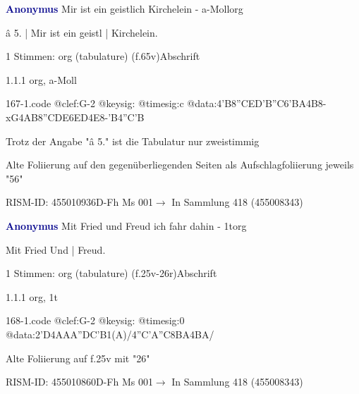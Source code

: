 \documentclass[twocolumn, 12pt]{book}
\begin{document}
\par \vspace{16pt} \textcolor{darkblue}{\textbf{Anonymus  }}\hfillplus{\textbf{[167]}}\newline Mir ist ein geistlich Kirchelein - a-Moll\newline org
\par \begin{itshape}[f.65v, at left:] â 5. | Mir ist ein geistl | Kirchelein.\end{itshape} 
\par \textcolor{darkblue}{}  1 Stimmen: org (tabulature)  (f.65v)\newline Abschrift
\par 1.1.1  org, a-Moll  
\begin{filecontents*}{167-1.code}
@clef:G-2
@keysig:
@timesig:c
@data:4'B{8''CE}{D'B''C6'BA}4B8-xG4AB{8''CDE6ED}4E8-'B4''C'B
\end{filecontents*}
\newline %
\par Trotz der Angabe "â 5." ist die Tabulatur nur zweistimmig
\par Alte Foliierung auf den gegenüberliegenden Seiten als Aufschlagfoliierung jeweils "56"
\par RISM-ID: 455010936\newline D-Fh  Ms 001\newline $\rightarrow$ In Sammlung 418 (455008343)
      
\par \vspace{16pt} \textcolor{darkblue}{\textbf{Anonymus  }}\hfillplus{\textbf{[168]}}\newline Mit Fried und Freud ich fahr dahin - 1t\newline org
\par \begin{itshape}[f.25v, at left:] Mit Fried Und | Freud.\end{itshape} 
\par \textcolor{darkblue}{}  1 Stimmen: org (tabulature)  (f.25v-26r)\newline Abschrift
\par 1.1.1  org, 1t  
\begin{filecontents*}{168-1.code}
@clef:G-2
@keysig:
@timesig:0
@data:2'D4AAA''DC'B1(A)/4''C'A''C{8BA}4BA/
\end{filecontents*}
\newline %
\par Alte Foliierung auf f.25v mit "26"
\par RISM-ID: 455010860\newline D-Fh  Ms 001\newline $\rightarrow$ In Sammlung 418 (455008343)
      
\end{document}
